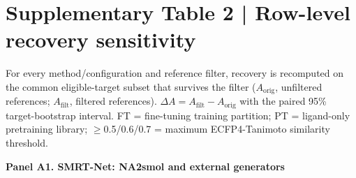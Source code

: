 \section*{Supplementary Table 2 | Row-level recovery sensitivity}

\noindent For every method/configuration and reference filter, recovery is recomputed on the common eligible-target subset that survives the filter ($A_{\text{orig}}$, unfiltered references; $A_{\text{filt}}$, filtered references). $\Delta A = A_{\text{filt}}-A_{\text{orig}}$ with the paired 95\% target-bootstrap interval. FT = fine-tuning training partition; PT = ligand-only pretraining library; $\geq$0.5/0.6/0.7 = maximum ECFP4-Tanimoto similarity threshold.

\textbf{Panel A1. SMRT-Net: NA2smol and external generators}

